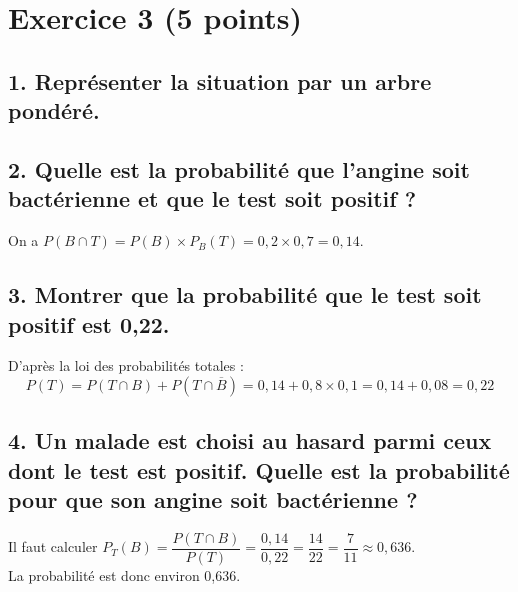 \section*{Exercice 3 (5 points)}
	

	
	\subsection*{1. Représenter la situation par un arbre pondéré.}
	
\begin{center}
\end{center}
	
	\subsection*{2. Quelle est la probabilité que l’angine soit bactérienne et que le test soit positif ?}
	
	On a $P(B \cap T) = P(B) \times P_B(T) = 0,2 \times 0,7 = 0,14$.
	
	\subsection*{3. Montrer que la probabilité que le test soit positif est 0,22.}
	
	D’après la loi des probabilités totales :
	\[
	P(T) = P(T \cap B) + P(T \cap \overline{B}) = 0,14 + 0,8 \times 0,1 = 0,14 + 0,08 = 0,22
	\]
	
	\subsection*{4. Un malade est choisi au hasard parmi ceux dont le test est positif. Quelle est la probabilité pour que son angine soit bactérienne ?}
	
	Il faut calculer $P_T(B) = \dfrac{P(T \cap B)}{P(T)} = \dfrac{0,14}{0,22} = \dfrac{14}{22} = \dfrac{7}{11} \approx 0,636$.\\ La probabilité est donc environ 0,636.

